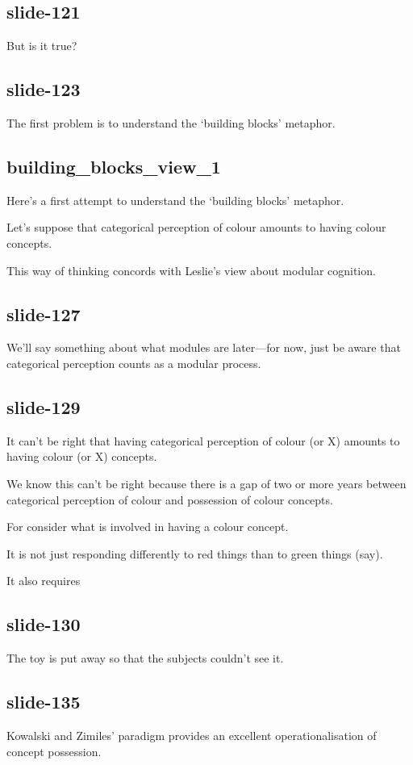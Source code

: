 \documentclass[12pt,\papersize]{extarticle}
\begin{document}
\subsection{slide-121}
But is it true?
 
\subsection{slide-123}
The first problem is to understand the ‘building blocks’ metaphor.
 
\subsection{building\_blocks\_view\_1}
Here's a first attempt to understand the ‘building blocks’ metaphor.
 
Let's suppose that categorical perception of colour amounts to having colour concepts.
 
This way of thinking concords with Leslie's view about modular cognition.
 
\subsection{slide-127}
We'll say something about what modules are later---for now, just be aware that categorical perception counts as a modular process.
 
\subsection{slide-129}
It can't be right that having categorical perception of colour (or X) amounts to having colour (or X) concepts.
 
We know this can't be right because there is a gap of two or more years between categorical perception of colour and possession of colour concepts.
 
For consider what is involved in having a colour concept.
 
It is not just responding differently to red things than to green things (say).
 
It also requires
 
\subsection{slide-130}
The toy is put away so that the subjects couldn't see it.
 
\subsection{slide-135}
Kowalski and Zimiles' paradigm provides an excellent operationalisation of concept possession.
 
\end{document}
